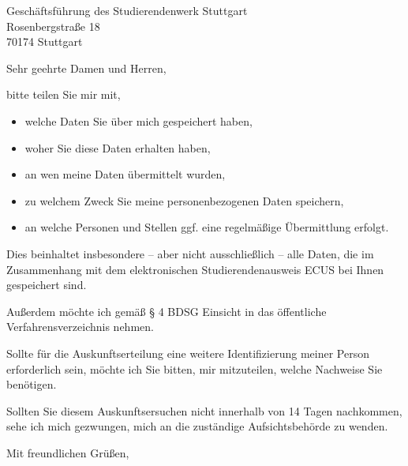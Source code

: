 \documentclass[11pt]{dinbrief}
\date{\today}
\begin{document}
\begin{letter}{Geschäftsführung des Studierendenwerk Stuttgart\\Rosenbergstraße 18\\70174 Stuttgart}
\centeraddress
\subject{\textbf{Antrag auf Auskunftserteilung gemäß § 34 BDSG}}
\opening{Sehr geehrte Damen und Herren,}
bitte teilen Sie mir mit,
\begin{itemize}
    \item welche Daten Sie über mich gespeichert haben,
    \item woher Sie diese Daten erhalten haben,
    \item an wen meine Daten übermittelt wurden,
    \item zu welchem Zweck Sie meine personenbezogenen Daten speichern,
    \item an welche Personen und Stellen ggf. eine regelmäßige Übermittlung erfolgt.
\end{itemize}

Dies beinhaltet insbesondere -- aber nicht ausschließlich -- alle Daten, die im Zusammenhang mit dem elektronischen Studierendenausweis ECUS bei Ihnen gespeichert sind.

Außerdem möchte ich gemäß § 4 BDSG Einsicht in das öffentliche Verfahrensverzeichnis nehmen.

Sollte für die Auskunftserteilung eine weitere Identifizierung meiner Person erforderlich sein, möchte ich Sie bitten, mir mitzuteilen, welche Nachweise Sie benötigen.

Sollten Sie diesem Auskunftsersuchen nicht innerhalb von 14 Tagen nachkommen, sehe ich mich gezwungen, mich an die zuständige Aufsichtsbehörde zu wenden.
\closing{Mit freundlichen Grüßen,}
\end{letter}
\end{document}
